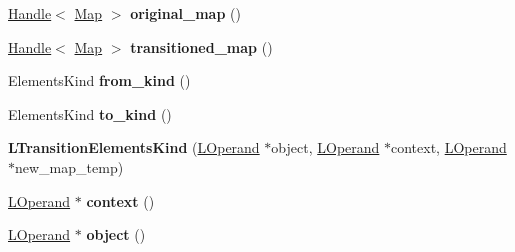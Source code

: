 \begin{DoxyCompactItemize}
\item 
\hyperlink{classv8_1_1internal_1_1_handle}{Handle}$<$ \hyperlink{classv8_1_1internal_1_1_map}{Map} $>$ {\bfseries original\+\_\+map} ()\hypertarget{classv8_1_1internal_1_1_l_transition_elements_kind_a1f6534ac0fae8a2a00aacbdb977df2e1}{}\label{classv8_1_1internal_1_1_l_transition_elements_kind_a1f6534ac0fae8a2a00aacbdb977df2e1}

\item 
\hyperlink{classv8_1_1internal_1_1_handle}{Handle}$<$ \hyperlink{classv8_1_1internal_1_1_map}{Map} $>$ {\bfseries transitioned\+\_\+map} ()\hypertarget{classv8_1_1internal_1_1_l_transition_elements_kind_a4ffe4230acac522bfd54c3789ccd213b}{}\label{classv8_1_1internal_1_1_l_transition_elements_kind_a4ffe4230acac522bfd54c3789ccd213b}

\item 
Elements\+Kind {\bfseries from\+\_\+kind} ()\hypertarget{classv8_1_1internal_1_1_l_transition_elements_kind_af634084f5d3f05e0700cc8d35a797465}{}\label{classv8_1_1internal_1_1_l_transition_elements_kind_af634084f5d3f05e0700cc8d35a797465}

\item 
Elements\+Kind {\bfseries to\+\_\+kind} ()\hypertarget{classv8_1_1internal_1_1_l_transition_elements_kind_a131f478caf0a117639ee35cd0bdeed59}{}\label{classv8_1_1internal_1_1_l_transition_elements_kind_a131f478caf0a117639ee35cd0bdeed59}

\item 
{\bfseries L\+Transition\+Elements\+Kind} (\hyperlink{classv8_1_1internal_1_1_l_operand}{L\+Operand} $\ast$object, \hyperlink{classv8_1_1internal_1_1_l_operand}{L\+Operand} $\ast$context, \hyperlink{classv8_1_1internal_1_1_l_operand}{L\+Operand} $\ast$new\+\_\+map\+\_\+temp)\hypertarget{classv8_1_1internal_1_1_l_transition_elements_kind_a6a44fc06b9c2f761c817997ec00269f3}{}\label{classv8_1_1internal_1_1_l_transition_elements_kind_a6a44fc06b9c2f761c817997ec00269f3}

\item 
\hyperlink{classv8_1_1internal_1_1_l_operand}{L\+Operand} $\ast$ {\bfseries context} ()\hypertarget{classv8_1_1internal_1_1_l_transition_elements_kind_aad280c0f1cf8e5ca120cf21b05bd93f0}{}\label{classv8_1_1internal_1_1_l_transition_elements_kind_aad280c0f1cf8e5ca120cf21b05bd93f0}

\item 
\hyperlink{classv8_1_1internal_1_1_l_operand}{L\+Operand} $\ast$ {\bfseries object} ()\hypertarget{classv8_1_1internal_1_1_l_transition_elements_kind_a0257a511e1579fbc39001caf5b0ca855}{}\label{classv8_1_1internal_1_1_l_transition_elements_kind_a0257a511e1579fbc39001caf5b0ca855}


\end{DoxyCompactItemize}
